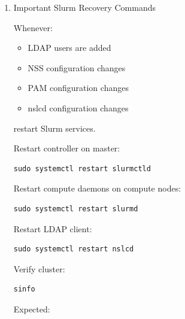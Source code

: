 \documentclass[11pt]{article}
\begin{document}
\begin{enumerate}
Attempting to start slurmd on login gives:

\begin{verbatim}
slurmd: fatal: Unable to determine this slurmd's NodeName
\end{verbatim}

This is NORMAL and expected.

Correct action on login node:

\begin{verbatim}
sudo systemctl stop slurmd
sudo systemctl disable slurmd
\end{verbatim}

Expected afterward:

\begin{verbatim}
inactive (dead)
\end{verbatim}

This is CORRECT for login nodes.
\item Important Slurm Recovery Commands
\label{sec:orgaf5b91b}

Whenever:

\begin{itemize}
\item LDAP users are added
\item NSS configuration changes
\item PAM configuration changes
\item nslcd configuration changes
\end{itemize}

restart Slurm services.

Restart controller on master:

\begin{verbatim}
sudo systemctl restart slurmctld
\end{verbatim}

Restart compute daemons on compute nodes:

\begin{verbatim}
sudo systemctl restart slurmd
\end{verbatim}

Restart LDAP client:

\begin{verbatim}
sudo systemctl restart nslcd
\end{verbatim}

Verify cluster:

\begin{verbatim}
sinfo
\end{verbatim}

Expected:


\end{enumerate}
\end{document}
